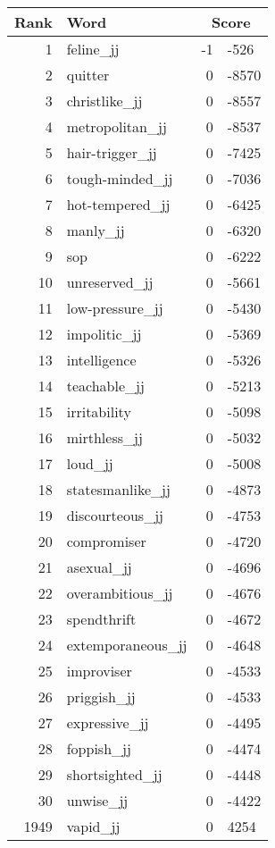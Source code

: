 \begin{longtable}[!htbp]{| rlr@{.}l |}
    \hline
    \textbf{Rank} & \textbf{Word} & \multicolumn{2}{c|}{\textbf{Score}} \\
    \hline
    \endhead
    1 & feline\_jj & -1 & -526 \\
    2 & quitter & 0 & -8570 \\
    3 & christlike\_jj & 0 & -8557 \\
    4 & metropolitan\_jj & 0 & -8537 \\
    5 & hair-trigger\_jj & 0 & -7425 \\
    6 & tough-minded\_jj & 0 & -7036 \\
    7 & hot-tempered\_jj & 0 & -6425 \\
    8 & manly\_jj & 0 & -6320 \\
    9 & sop & 0 & -6222 \\
    10 & unreserved\_jj & 0 & -5661 \\
    11 & low-pressure\_jj & 0 & -5430 \\
    12 & impolitic\_jj & 0 & -5369 \\
    13 & intelligence & 0 & -5326 \\
    14 & teachable\_jj & 0 & -5213 \\
    15 & irritability & 0 & -5098 \\
    16 & mirthless\_jj & 0 & -5032 \\
    17 & loud\_jj & 0 & -5008 \\
    18 & statesmanlike\_jj & 0 & -4873 \\
    19 & discourteous\_jj & 0 & -4753 \\
    20 & compromiser & 0 & -4720 \\
    21 & asexual\_jj & 0 & -4696 \\
    22 & overambitious\_jj & 0 & -4676 \\
    23 & spendthrift & 0 & -4672 \\
    24 & extemporaneous\_jj & 0 & -4648 \\
    25 & improviser & 0 & -4533 \\
    26 & priggish\_jj & 0 & -4533 \\
    27 & expressive\_jj & 0 & -4495 \\
    28 & foppish\_jj & 0 & -4474 \\
    29 & shortsighted\_jj & 0 & -4448 \\
    30 & unwise\_jj & 0 & -4422 \\
    1949 & vapid\_jj & 0 & 4254 \\

\end{longtable}
